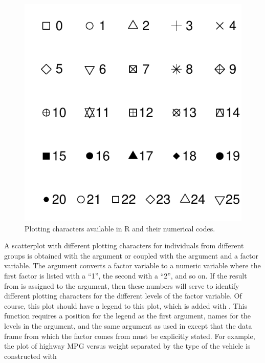 \documentclass[10pt,openany]{book}\usepackage[]{graphicx}\usepackage[]{color}
\newenvironment{knitrout}{}{} %
\begin{document}
\begin{knitrout}
\color{fgcolor}\begin{figure}[hbtp]

{\centering \includegraphics[width=.4\linewidth]{Figs/Rpch-1} 

}

\caption[Plotting characters available in R and their numerical codes]{Plotting characters available in R and their numerical codes.}\label{fig:Rpch}
\end{figure}


\end{knitrout}

A scatterplot with different plotting characters for individuals from different groups is obtained with the  argument or  coupled with the  argument and a factor variable.  The  argument converts a factor variable to a numeric variable where the first factor is listed with a ``1'', the second with a ``2'', and so on.  If the result from   is assigned to the  argument, then these numbers will serve to identify different plotting characters for the different levels of the factor variable.  Of course, this plot should have a legend to this plot, which is added with .  This function requires a position for the legend as the first argument, names for the levels in the  argument, and the same  argument as used in  except that the data frame from which the factor comes from must be explicitly stated.  For example, the plot of highway MPG versus weight separated by the type of the vehicle  is constructed with
\end{document}
